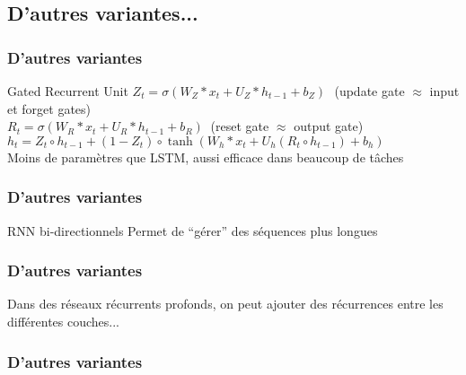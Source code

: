 \subsection{D'autres variantes...}

\begin{frame}
  \frametitle{D'autres variantes}
  Gated Recurrent Unit
  $Z_{t}=\sigma (W_{Z}*x_{t}+U_{Z}*h_{t-1}+b_{Z})\,\,\,\,$(update gate $\approx$ input et forget gates) \\
  $R_{t}=\sigma (W_{R}*x_{t}+U_{R}*h_{t-1}+b_{R})\;\;$(reset gate $\approx$ output gate) \\
  $h_{t}=Z_{t}\circ h_{t-1}+(1-Z_{t})\circ \tanh(W_{h}*x_{t}+U_{h}(R_{t}\circ h_{t-1})+b_{h})$ \\
  Moins de paramètres que LSTM, aussi efficace dans beaucoup de tâches
\end{frame}

\begin{frame}
  \frametitle{D'autres variantes}
  RNN bi-directionnels
  Permet de ``gérer'' des séquences plus longues
\end{frame}

\begin{frame}
  \frametitle{D'autres variantes}
  Dans des réseaux récurrents profonds, on peut ajouter des récurrences entre les différentes couches... \\
\end{frame}

\begin{frame}
  \frametitle{D'autres variantes}
\end{frame}
